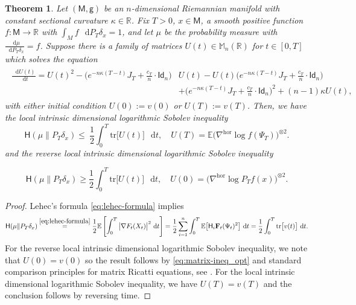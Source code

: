 \documentclass[a4paper,twoside,11pt,reqno]{amsart}
\newtheorem{theorem}{Theorem}
\newcommand*\diff{\mathop{}\!\mathrm{d}}
\newcommand{\R}{\mathbb{R}} %
\newcommand{\li}{\bf }
\newcommand{\MM}{\mathsf{M}}
\newcommand{\GG}{\mathsf{g}}
\newcommand{\mb}{\mathbb}
\newcommand{\msf}{\mathsf}
\newcommand{\mr}{\mathrm}
\newcommand{\HH}{\mathsf{H}}
\begin{document}
\begin{theorem}
\label{thm:manifolds_opt}
Let $(\MM,\GG)$ be an $n$-dimensional Riemannian manifold with constant sectional curvature $\kappa\in\R$. Fix $T>0$, $x\in\MM$, a smooth positive function $f:\MM\to\R$ with $\int_M f\,\diff P_T\delta_x=1$, and let $\mu$ be the probability measure with $\frac{\diff\mu}{\diff P_T\delta_x}=f$. Suppose there is a family of matrices $U(t)\in \mathbb M_n(\R)$ for $t\in [0,T]$ which solves the equation
\begin{align} \label{eq:matrix-ODE}
\begin{split}
\frac{\diff U(t)}{\diff t} = U(t)^2- \Big( e^{-n\kappa(T-t)} J_T+\tfrac{c_T}{n}\cdot \msf{Id}_n  \Big) &U(t)  - U(t)\Big( e^{-n\kappa(T-t)} J_T+\tfrac{c_T}{n}\cdot \msf{Id}_n  \Big)\\ 
& +  \Big( e^{-n\kappa(T-t)} J_T + \tfrac{c_T}{n}\cdot \msf{Id}_n \Big)^2 + (n-1)\kappa U(t),
\end{split}
\end{align}
with either initial condition $U(0):=v(0)$ or $U(T):=v(T)$. Then, we have the local intrinsic dimensional logarithmic Sobolev inequality
\begin{equation} \label{eq:manifolds-lsi_opt}
\HH(\mu \| P_T\delta_x) \leq \ \frac{1}{2}\int_0^T \mr{tr}\big[U(t)\big] \,\diff t, \quad U(T)=\mb{E} \big( \nabla^{\mr{hor}} \log f(\Psi_T)\big)^{\otimes 2}.
\end{equation}
and the reverse local intrinsic dimensional logarithmic Sobolev inequality

\begin{equation} \label{eq:manifolds-rev-lsi_opt}
\HH(\mu \| P_T\delta_x) \geq \frac{1}{2}\int_0^T \mr{tr}\big[U(t)\big] \,\diff t, \quad U(0)=\big( \nabla^{\mr{hor}}\log P_Tf(x)\big)^{\otimes2}.
\end{equation}
\end{theorem}

\begin{proof}
Lehec's formula \eqref{eq:lehec-formula} implies
\begin{equation}  \label{eq:use-lehec_opt}
\HH(\mu \| P_T\delta_x)  \stackrel{\eqref{eq:lehec-formula}}{=} \frac{1}{2}\mb{E} \left[ \int_0^T \big| \nabla F_t(X_t)\big|^2\,\diff t \right] = \frac{1}{2} \sum_{i=1}^n \int_0^T \mb{E}\big[ \HH_i {\li F}_t(\Psi_t)^2\big]\,\diff t = \frac{1}{2}\int_0^T \mr{tr}\big[ v(t)\big] \,\diff t.
\end{equation}
For the reverse local intrinsic dimensional logarithmic Sobolev inequality, we note that $U(0)=v(0)$ so the result follows by \eqref{eq:matrix-ineq_opt} and standard comparison principles for matrix Ricatti equations, see \cite{Jon75}. For the local intrinsic dimensional logarithmic Sobolev inequality, we have $U(T)=v(T)$ and the conclusion follows by reversing time.
\end{proof}
\end{document}
